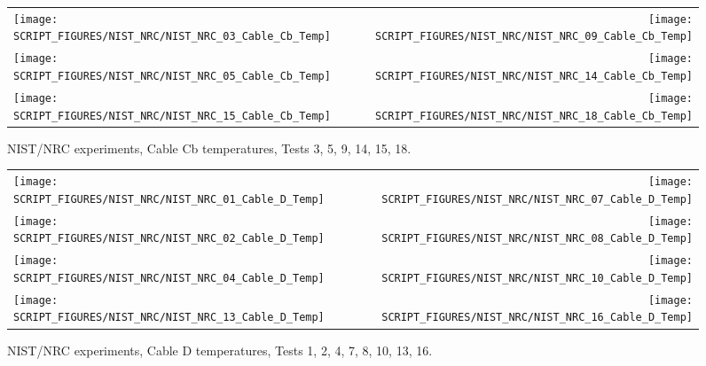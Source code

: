 \begin{figure}[p]
\begin{tabular*}{\textwidth}{l@{\extracolsep{\fill}}r}
\texttt{[image: SCRIPT\_FIGURES/NIST\_NRC/NIST\_NRC\_03\_Cable\_Cb\_Temp]} &
\texttt{[image: SCRIPT\_FIGURES/NIST\_NRC/NIST\_NRC\_09\_Cable\_Cb\_Temp]} \\
\texttt{[image: SCRIPT\_FIGURES/NIST\_NRC/NIST\_NRC\_05\_Cable\_Cb\_Temp]} &
\texttt{[image: SCRIPT\_FIGURES/NIST\_NRC/NIST\_NRC\_14\_Cable\_Cb\_Temp]} \\
\texttt{[image: SCRIPT\_FIGURES/NIST\_NRC/NIST\_NRC\_15\_Cable\_Cb\_Temp]} &
\texttt{[image: SCRIPT\_FIGURES/NIST\_NRC/NIST\_NRC\_18\_Cable\_Cb\_Temp]}
\end{tabular*}
\caption[NIST/NRC experiments, Cable Cb temperatures, Tests 3, 5, 9, 14, 15, 18]{NIST/NRC experiments, Cable Cb temperatures, Tests 3, 5, 9, 14, 15, 18.}
\label{NIST_NRC_Cable_Cb_Open}
\end{figure}

\begin{figure}[p]
\begin{tabular*}{\textwidth}{l@{\extracolsep{\fill}}r}
\texttt{[image: SCRIPT\_FIGURES/NIST\_NRC/NIST\_NRC\_01\_Cable\_D\_Temp]} &
\texttt{[image: SCRIPT\_FIGURES/NIST\_NRC/NIST\_NRC\_07\_Cable\_D\_Temp]} \\
\texttt{[image: SCRIPT\_FIGURES/NIST\_NRC/NIST\_NRC\_02\_Cable\_D\_Temp]} &
\texttt{[image: SCRIPT\_FIGURES/NIST\_NRC/NIST\_NRC\_08\_Cable\_D\_Temp]} \\
\texttt{[image: SCRIPT\_FIGURES/NIST\_NRC/NIST\_NRC\_04\_Cable\_D\_Temp]} &
\texttt{[image: SCRIPT\_FIGURES/NIST\_NRC/NIST\_NRC\_10\_Cable\_D\_Temp]} \\
\texttt{[image: SCRIPT\_FIGURES/NIST\_NRC/NIST\_NRC\_13\_Cable\_D\_Temp]} &
\texttt{[image: SCRIPT\_FIGURES/NIST\_NRC/NIST\_NRC\_16\_Cable\_D\_Temp]}
\end{tabular*}
\caption[NIST/NRC experiments, Cable D temperatures, Tests 1, 2, 4, 7, 8, 10, 13, 16]{NIST/NRC experiments, Cable D temperatures, Tests 1, 2, 4, 7, 8, 10, 13, 16.}
\label{NIST_NRC_Cable_D_Closed}
\end{figure}

